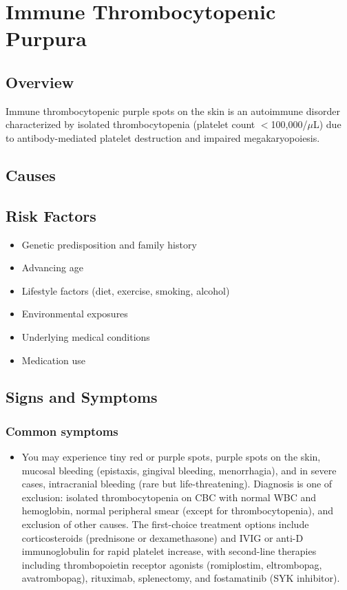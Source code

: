 \chapter{Immune Thrombocytopenic Purpura}
\label{sec:Immune Thrombocytopenic Purpura}

\section{Overview}
Immune thrombocytopenic purple spots on the skin is an autoimmune disorder characterized by isolated thrombocytopenia (platelet count $<$100,000/$\mu$L) due to antibody-mediated platelet destruction and impaired megakaryopoiesis.
\section{Causes}
\section{Risk Factors}

\begin{itemize}[noitemsep]
  \item Genetic predisposition and family history
  \item Advancing age
  \item Lifestyle factors (diet, exercise, smoking, alcohol)
  \item Environmental exposures
  \item Underlying medical conditions
  \item Medication use
\end{itemize}
\section{Signs and Symptoms}

\subsection{Common symptoms}
\begin{itemize}[noitemsep]
  \item You may experience tiny red or purple spots, purple spots on the skin, mucosal bleeding (epistaxis, gingival bleeding, menorrhagia), and in severe cases, intracranial bleeding (rare but life-threatening). Diagnosis is one of exclusion: isolated thrombocytopenia on CBC with normal WBC and hemoglobin, normal peripheral smear (except for thrombocytopenia), and exclusion of other causes. The first-choice treatment options include corticosteroids (prednisone or dexamethasone) and IVIG or anti-D immunoglobulin for rapid platelet increase, with second-line therapies including thrombopoietin receptor agonists (romiplostim, eltrombopag, avatrombopag), rituximab, splenectomy, and fostamatinib (SYK inhibitor). 
  \end{itemize}

